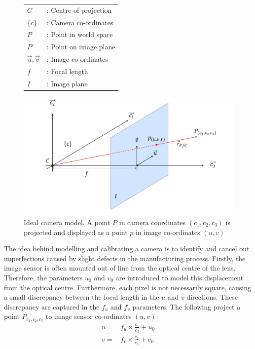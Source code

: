 \documentclass{UoNMCHA}
\numberwithin{equation}{section}
\begin{document}
\begin{figure}[ht]
	\begin{minipage}[c]{0.3\linewidth}
		\centering
		\begin{tabular}{l l}
			$C$ &: Centre of projection\\
			$\{c\}$ &: Camera co-ordinates\\
			$P$ &: Point in world space\\
			$P'$ &: Point on image plane\\
			$\vec{u}, \vec{v}$ &: Image co-ordinates\\
			$f$ &: Focal length\\
			$I$ &: Image plane
		\end{tabular}
	\end{minipage}
	\begin{minipage}[c]{0.65\linewidth}
		\includegraphics[width=1\linewidth]{Figures/Planar_Model}	
	\end{minipage}
\caption{Ideal camera model. A point $P$ in camera coordinates $(c_{1}, c_{2}, c_{3})$ is projected and displayed as a point $p$ in image co-ordinates $(u, v)$}
\label{fig:PlainarModel}
\end{figure}
The idea behind modelling and calibrating a camera is to identify and cancel out imperfections caused by slight defects in the manufacturing process. Firstly, the image sensor is often mounted out of line from the optical centre of the lens. Therefore, the parameters $u_{0}$ and $v_{0}$ are introduced to model this displacement from the optical centre. Furthermore, each pixel is not necessarily square, causing a small discrepancy between the focal length in the $u$ and $v$ directions. These discrepancy are captured in the $f_{u}$ and $f_{v}$ parameters. The following  project a point $P_{c_{1}, c_{2}, c_{3}}$ to image sensor co-ordinates $(u, v)$:
\begin{equation}\label{eq:ProjectionEquations}
	\begin{split}
		u = &f_{u} \times \frac{c_{1}}{c_{3}} + u_{0}\\
		v = &f_{v} \times \frac{c_{2}}{c_{3}} + v_{0}
	\end{split}
\end{equation}
\end{document}
